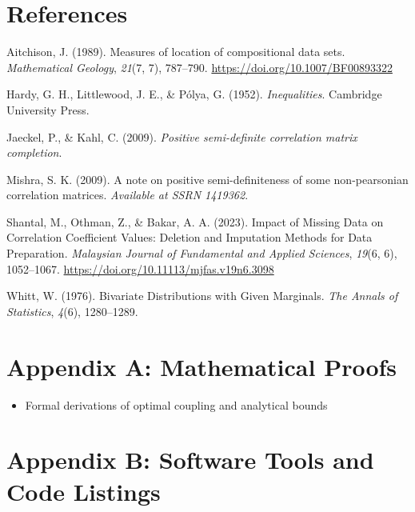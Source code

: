 \documentclass[
  12pt,
]{article}
\providecommand{\tightlist}{%
  \setlength{\itemsep}{0pt}\setlength{\parskip}{0pt}}\usepackage{longtable,booktabs,array}
\newlength{\cslhangindent}
\newenvironment{CSLReferences}[2] %
 {\begin{list}{}{%
  \setlength{\itemindent}{0pt}
  \setlength{\leftmargin}{0pt}
  \setlength{\parsep}{0pt}
  \ifodd #1
   \setlength{\leftmargin}{\cslhangindent}
   \setlength{\itemindent}{-1\cslhangindent}
  \fi
  \setlength{\itemsep}{#2\baselineskip}}}
 {\end{list}}
\theoremstyle{plain}
\theoremstyle{definition}
\theoremstyle{remark}
\begin{document}
\newpage

\section{References}\label{references}

\label{refs}
\begin{CSLReferences}{1}{0}
Aitchison, J. (1989). Measures of location of compositional data sets.
\emph{Mathematical Geology}, \emph{21}(7, 7), 787--790.
\url{https://doi.org/10.1007/BF00893322}

Hardy, G. H., Littlewood, J. E., \& Pólya, G. (1952).
\emph{Inequalities}. Cambridge University Press.

Jaeckel, P., \& Kahl, C. (2009). \emph{Positive semi-definite
correlation matrix completion}.

Mishra, S. K. (2009). A note on positive semi-definiteness of some
non-pearsonian correlation matrices. \emph{Available at SSRN 1419362}.

Shantal, M., Othman, Z., \& Bakar, A. A. (2023). Impact of {Missing
Data} on {Correlation Coefficient Values}: {Deletion} and {Imputation
Methods} for {Data Preparation}. \emph{Malaysian Journal of Fundamental
and Applied Sciences}, \emph{19}(6, 6), 1052--1067.
\url{https://doi.org/10.11113/mjfas.v19n6.3098}

Whitt, W. (1976). Bivariate {Distributions} with {Given Marginals}.
\emph{The Annals of Statistics}, \emph{4}(6), 1280--1289.

\end{CSLReferences}

\newpage

\appendix

\section{Appendix A: Mathematical
Proofs}\label{appendix-a-mathematical-proofs}

\begin{itemize}
\tightlist
\item
  Formal derivations of optimal coupling and analytical bounds
\end{itemize}

\section{Appendix B: Software Tools and Code
Listings}\label{appendix-b-software-tools-and-code-listings}
\end{document}
